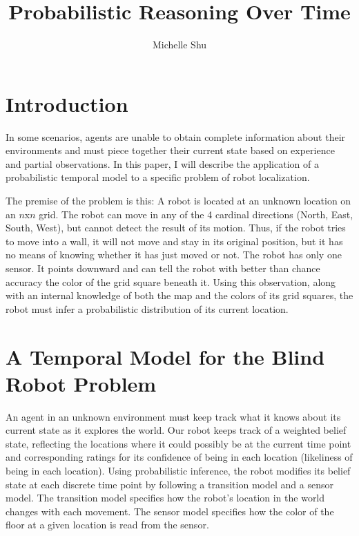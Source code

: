 \documentclass{article}
\title{Probabilistic Reasoning Over Time}
\author{Michelle Shu}
\begin{document}
\maketitle

\section{Introduction}

In some scenarios, agents are unable to obtain complete information about their environments and must piece together their current state based on experience and partial observations. In this paper, I will describe the application of a probabilistic temporal model to a specific problem of robot localization. 

\vspace{2mm}

The premise of the problem is this: A robot is located at an unknown location on an $n$x$n$ grid. The robot can move in any of the 4 cardinal directions (North, East, South, West), but cannot detect the result of its motion. Thus, if the robot tries to move into a wall, it will not move and stay in its original position, but it has no means of knowing whether it has just moved or not. The robot has only one sensor. It points downward and can tell the robot with better than chance accuracy the color of the grid square beneath it. Using this observation, along with an internal knowledge of both the map and the colors of its grid squares, the robot must infer a probabilistic distribution of its current location.

\section{A Temporal Model for the Blind Robot Problem}

An agent in an unknown environment must keep track what it knows about its current state as it explores the world. Our robot keeps track of a weighted belief state, reflecting the locations where it could possibly be at the current time point and corresponding ratings for its confidence of being in each location (likeliness of being in each location). Using probabilistic inference, the robot modifies its belief state at each discrete time point by following a transition model and a sensor model. The transition model specifies how the robot's location in the world changes with each movement. The sensor model specifies how the color of the floor at a given location is read from the sensor.
\end{document}
